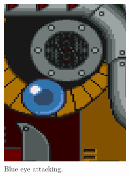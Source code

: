 \begin{figure}[htp]
\begin{subfigure}[t]{0.30\linewidth}
		\includegraphics[width=\linewidth]{figures/X1/Sigma_stages/Rangda_blue.jpg}
		\caption{Blue eye attacking.}
	\end{subfigure}
	\begin{subfigure}[t]{0.30\linewidth}
		\centering

\end{subfigure}
\end{figure}
